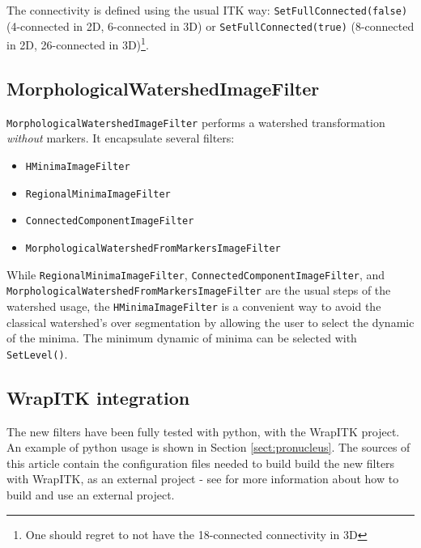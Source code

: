 \documentclass{InsightArticle}
\begin{document}

The connectivity is defined using the usual ITK way: \verb$SetFullConnected(false)$
(4-connected in 2D, 6-connected in 3D) or \verb$SetFullConnected(true)$ (8-connected
in 2D, 26-connected in 3D)\footnote{One should regret to not have the 18-connected
connectivity in 3D}.

  \subsection{MorphologicalWatershedImageFilter}

\verb$MorphologicalWatershedImageFilter$ performs a watershed transformation
{\em without} markers. It encapsulate several filters:
\begin{itemize}
  \item \verb$HMinimaImageFilter$
  \item \verb$RegionalMinimaImageFilter$
  \item \verb$ConnectedComponentImageFilter$
  \item \verb$MorphologicalWatershedFromMarkersImageFilter$
\end{itemize}
While \verb$RegionalMinimaImageFilter$, \verb$ConnectedComponentImageFilter$,
and \verb$MorphologicalWatershedFromMarkersImageFilter$ are the usual steps
of the watershed usage, the \verb$HMinimaImageFilter$ is a convenient way
to avoid the classical watershed's over segmentation by allowing the user
to select the dynamic of the minima. The minimum dynamic of minima can be
selected with \verb$SetLevel()$.

  \subsection{WrapITK integration}

The new filters have been fully tested with python, with the WrapITK project.
An example of python usage is shown in Section \ref{sect:pronucleus}.
The sources of this article contain the configuration files needed to build
build the new filters with WrapITK, as an external project - see \cite{WrapITK}
for more information about how to build and use an external project.
\end{document}
